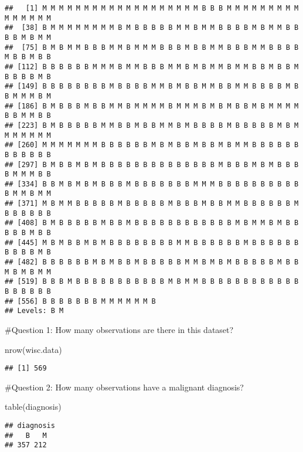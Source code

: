 \documentclass[
]{article}
\newenvironment{Shaded}{\begin{snugshade}}{\end{snugshade}}
\newcommand{\FunctionTok}[1]{\textcolor[rgb]{0.00,0.00,0.00}{#1}}
\newcommand{\NormalTok}[1]{#1}
\begin{document}
\begin{verbatim}
##   [1] M M M M M M M M M M M M M M M M M M M B B B M M M M M M M M M M M M M M M
##  [38] B M M M M M M M M B M B B B B B M M B M M B B B B M B M M B B B B M B M M
##  [75] B M B M M B B B M M B M M M B B B M B B M M B B B M M B B B B M B B M B B
## [112] B B B B B B M M M B M M B B B M M B M B M M B M M B B M B B M B B B B M B
## [149] B B B B B B B B M B B B B M M B M B B M M B B M M B B B B M B B M M M B M
## [186] B M B B B M B B M M B M M M M B M M M B M B M B B M B M M M M B B M M B B
## [223] B M B B B B B M M B B M B B M M B M B B B B M B B B B B M B M M M M M M M
## [260] M M M M M M M B B B B B B M B M B B M B B M B M M B B B B B B B B B B B B
## [297] B M B B M B M B B B B B B B B B B B B B B M B B B M B M B B B B M M M B B
## [334] B B M B M B M B B B M B B B B B B B M M M B B B B B B B B B B B M M B M M
## [371] M B M M B B B B B M B B B B B M B B B M B B M M B B B B B B M B B B B B B
## [408] B M B B B B B M B B M B B B B B B B B B B B B M B M M B M B B B B B M B B
## [445] M B M B B M B M B B B B B B B B M M B B B B B B M B B B B B B B B B B M B
## [482] B B B B B B M B M B B M B B B B B M M B M B M B B B B B M B B M B M B M M
## [519] B B B M B B B B B B B B B B B M B M M B B B B B B B B B B B B B B B B B B
## [556] B B B B B B B M M M M M M B
## Levels: B M
\end{verbatim}

\#Question 1: How many observations are there in this dataset?

\begin{Shaded}
\begin{Highlighting}[]
\FunctionTok{nrow}\NormalTok{(wisc.data)}
\end{Highlighting}
\end{Shaded}

\begin{verbatim}
## [1] 569
\end{verbatim}

\#Question 2: How many observations have a malignant diagnosis?

\begin{Shaded}
\begin{Highlighting}[]
\FunctionTok{table}\NormalTok{(diagnosis)}
\end{Highlighting}
\end{Shaded}

\begin{verbatim}
## diagnosis
##   B   M 
## 357 212
\end{verbatim}
\end{document}
